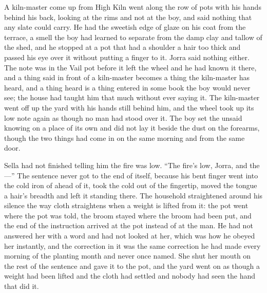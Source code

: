 A kiln-master come up from High Kiln went along the row of pots with his hands behind his back, looking at the rims and not at the boy, and said nothing that any slate could carry. He had the sweetish edge of glaze on his coat from the terrace, a smell the boy had learned to separate from the damp clay and tallow of the shed, and he stopped at a pot that had a shoulder a hair too thick and passed his eye over it without putting a finger to it. Jorra said nothing either. The note was in the Vail pot before it left the wheel and he had known it there, and a thing said in front of a kiln-master becomes a thing the kiln-master has heard, and a thing heard is a thing entered in some book the boy would never see; the house had taught him that much without ever saying it. The kiln-master went off up the yard with his hands still behind him, and the wheel took up its low note again as though no man had stood over it. The boy set the unsaid knowing on a place of its own and did not lay it beside the dust on the forearms, though the two things had come in on the same morning and from the same door.

\scenebreak

Sella had not finished telling him the fire was low. “The fire's low, Jorra, and the—” The sentence never got to the end of itself, because his bent finger went into the cold iron of  ahead of it, took the cold out of the fingertip, moved the tongue a hair's breadth and left it standing there. The household straightened around his silence the way cloth straightens when a weight is lifted from it: the pot went where the pot was told, the broom stayed where the broom had been put, and the end of the instruction arrived at the pot instead of at the man. He had not answered her with a word and had not looked at her, which was how he obeyed her instantly, and the correction in it was the same correction he had made every morning of the planting month and never once named. She shut her mouth on the rest of the sentence and gave it to the pot, and the yard went on as though a weight had been lifted and the cloth had settled and nobody had seen the hand that did it.

